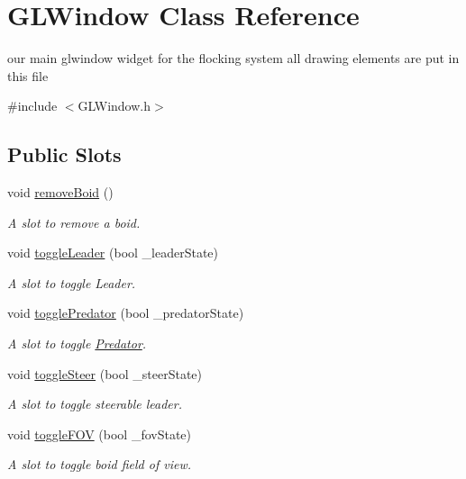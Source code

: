 \hypertarget{classGLWindow}{
\section{GLWindow Class Reference}
\label{classGLWindow}
}


our main glwindow widget for the flocking system all drawing elements are put in this file  


{\ttfamily \#include $<$GLWindow.h$>$}\subsection*{Public Slots}
\begin{DoxyCompactItemize}
\item 
void \hyperlink{classGLWindow_a092b2f8ed729523621fa725c77ce7ac7}{removeBoid} ()
\begin{DoxyCompactList}\small\item\em A slot to remove a boid. \item\end{DoxyCompactList}\item 
void \hyperlink{classGLWindow_a0bc4363f3a83e156cc66a7333f86abfc}{toggleLeader} (bool \_\-leaderState)
\begin{DoxyCompactList}\small\item\em A slot to toggle Leader. \item\end{DoxyCompactList}\item 
void \hyperlink{classGLWindow_abdb002d0a22ee91d2d8d9f2f35d00103}{togglePredator} (bool \_\-predatorState)
\begin{DoxyCompactList}\small\item\em A slot to toggle \hyperlink{classPredator}{Predator}. \item\end{DoxyCompactList}\item 
void \hyperlink{classGLWindow_a49dd1428dd40fd7862dbebe503f71e8d}{toggleSteer} (bool \_\-steerState)
\begin{DoxyCompactList}\small\item\em A slot to toggle steerable leader. \item\end{DoxyCompactList}\item 
void \hyperlink{classGLWindow_a9f73aec1a8fafb7511eb692fd8a5b534}{toggleFOV} (bool \_\-fovState)
\begin{DoxyCompactList}\small\item\em A slot to toggle boid field of view. \item\end{DoxyCompactList}\item 

\end{DoxyCompactItemize}
